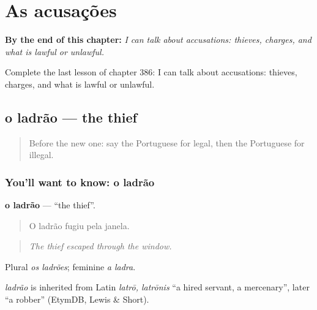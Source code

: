 
\chapter{As acusações}
\label{ch:pt-as-acusacoes}

\begin{chapteropening}
\textbf{By the end of this chapter:} \emph{I can talk about accusations: thieves, charges, and what is lawful or unlawful.}

Complete the last lesson of chapter 386: I can talk about accusations: thieves, charges, and what is lawful or unlawful.
\end{chapteropening}

\section[o ladrão]{o ladrão — the thief}

\label{lesson:PT-C386-ladrao}



\begin{quote}
Before the new one: say the Portuguese for legal, then the Portuguese for illegal.
\end{quote}

\subsection*{You'll want to know: o ladrão}
\textbf{o ladrão} — \textquotedblleft{}the thief\textquotedblright{}.

\begin{quote}
O ladrão fugiu pela janela.
\end{quote}

\begin{quote}
\emph{The thief escaped through the window.}
\end{quote}

Plural \emph{os ladrões}; feminine \emph{a ladra}.

\begin{cousinweb}
\emph{ladrão} is inherited from Latin \emph{latrō, latrōnis} \textquotedblleft{}a hired servant, a mercenary\textquotedblright{}, later \textquotedblleft{}a robber\textquotedblright{} (EtymDB, Lewis \& Short).
\end{cousinweb}

